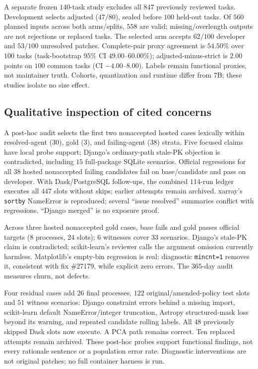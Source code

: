 \documentclass[10pt,conference]{IEEEtran}
\begin{document}
A separate frozen $140$-task study excludes all $847$ previously reviewed tasks.
Development selects adjusted ($47/80$), sealed
before $100$ held-out tasks. Of $560$ planned inputs across both arms/splits,
$558$ are valid;
missing/overlength outputs are not rejections or replaced tasks. The selected arm
accepts $62/100$ developer and
$53/100$ unresolved patches.
Complete-pair proxy agreement is $54.50\%$ over
$100$ tasks (task-bootstrap $95\%$ CI $49.00$--$60.00\%$);
adjusted-minus-strict is $2.00$ points on $100$ common tasks
(CI $-4.00$--$8.00$). Labels remain functional proxies, not maintainer truth.
Cohorts, quantization and runtime differ from 7B; these studies isolate no size effect.

\subsection{Qualitative inspection of cited concerns}
A post-hoc audit selects the first two nonaccepted hosted cases lexically
within resolved-agent ($30$), gold ($3$), and failing-agent ($38$) strata.
Five focused claims have local probe support; Django's ordinary-path stale-PK objection is
contradicted, including $15$ full-package SQLite scenarios. Official regressions
for all $38$ hosted nonaccepted failing candidates fail on base/candidate and
pass on developer. With Dask/PostgreSQL follow-ups, the combined $114$-run
ledger executes all $447$ slots without skips; earlier attempts remain archived.
xarray's \texttt{sortby} NameError is reproduced; several ``issue resolved''
summaries conflict with regressions. ``Django merged'' is no exposure proof.

Across three hosted nonaccepted gold cases, base fails and gold passes official targets
($8$ processes, $24$ slots); $6$ witnesses cover $33$ scenarios. Django's stale-PK claim
is contradicted; scikit-learn's reviewer calls the argument omission currently harmless.
Matplotlib's empty-bin regression is real: diagnostic \texttt{mincnt=1} removes it,
consistent with fix \#27179, while explicit zero errors. The $365$-day audit measures
churn, not defects.

Four residual cases add $26$ final processes, $122$ original/amended-policy test
slots and $51$ witness scenarios: Django constraint errors behind a missing import,
scikit-learn default NameError/integer truncation, Astropy structured-mask loss
beyond its warning, and repeated candidate rolling labels. All $48$ previously skipped
Dask slots now execute. A PCA path remains correct. Ten replaced attempts remain archived.
These post-hoc probes support functional findings, not every rationale sentence
or a population error rate. Diagnostic interventions are not original patches;
no full container harness is run.
\end{document}
